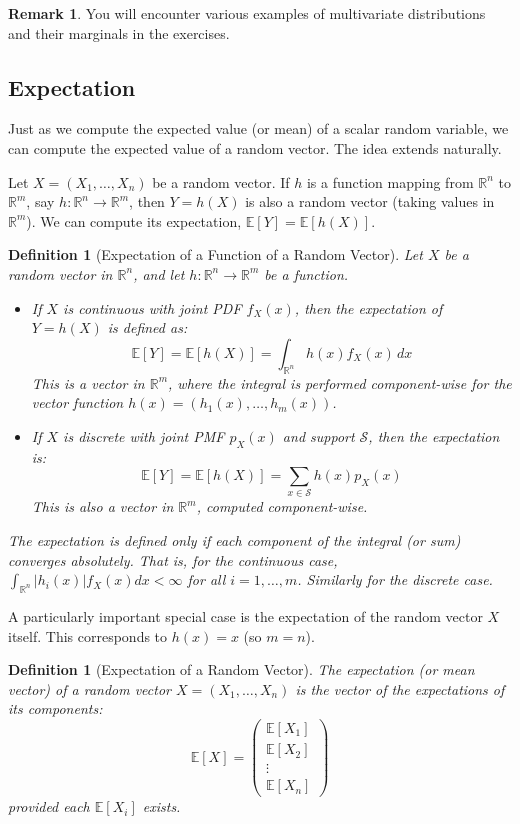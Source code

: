\documentclass[11pt, a4paper]{article}
\newtheorem{definition}[theorem]{Definition}
\theoremstyle{definition} %
\newtheorem{remark}[theorem]{Remark}
\newcommand{\R}{\mathbb{R}}
\newcommand{\E}{\mathbb{E}} %
\begin{document}
\begin{remark}
You will encounter various examples of multivariate distributions and their marginals in the exercises.
\end{remark}

\subsection{Expectation}

Just as we compute the expected value (or mean) of a scalar random variable, we can compute the expected value of a random vector. The idea extends naturally.

Let $X = (X_1, \dots, X_n)$ be a random vector. If $h$ is a function mapping from $\R^n$ to $\R^m$, say $h: \R^n \to \R^m$, then $Y = h(X)$ is also a random vector (taking values in $\R^m$). We can compute its expectation, $\E[Y] = \E[h(X)]$.

\begin{definition}[Expectation of a Function of a Random Vector]
Let $X$ be a random vector in $\R^n$, and let $h: \R^n \to \R^m$ be a function.
\begin{itemize}
    \item If $X$ is continuous with joint PDF $f_X(x)$, then the expectation of $Y = h(X)$ is defined as:
    \[ \E[Y] = \E[h(X)] = \int_{\R^n} h(x) f_X(x) \, dx \]
    This is a vector in $\R^m$, where the integral is performed component-wise for the vector function $h(x) = (h_1(x), \dots, h_m(x))$.
    \item If $X$ is discrete with joint PMF $p_X(x)$ and support $\mathcal{S}$, then the expectation is:
    \[ \E[Y] = \E[h(X)] = \sum_{x \in \mathcal{S}} h(x) p_X(x) \]
    This is also a vector in $\R^m$, computed component-wise.
\end{itemize}
The expectation is defined only if each component of the integral (or sum) converges absolutely. That is, for the continuous case, $\int_{\R^n} |h_i(x)| f_X(x) dx < \infty$ for all $i=1, \dots, m$. Similarly for the discrete case.
\end{definition}

A particularly important special case is the expectation of the random vector $X$ itself. This corresponds to $h(x) = x$ (so $m=n$).

\begin{definition}[Expectation of a Random Vector]
The expectation (or mean vector) of a random vector $X = (X_1, \dots, X_n)$ is the vector of the expectations of its components:
\[ \E[X] = \begin{pmatrix} \E[X_1] \\ \E[X_2] \\ \vdots \\ \E[X_n] \end{pmatrix} \]
provided each $\E[X_i]$ exists.
\end{definition}
\end{document}
